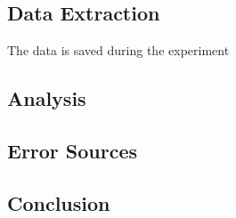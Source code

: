 \subsection{Data Extraction}
The data is saved during the experiment

\subsection{Analysis}

\subsection{Error Sources}

\subsection{Conclusion}